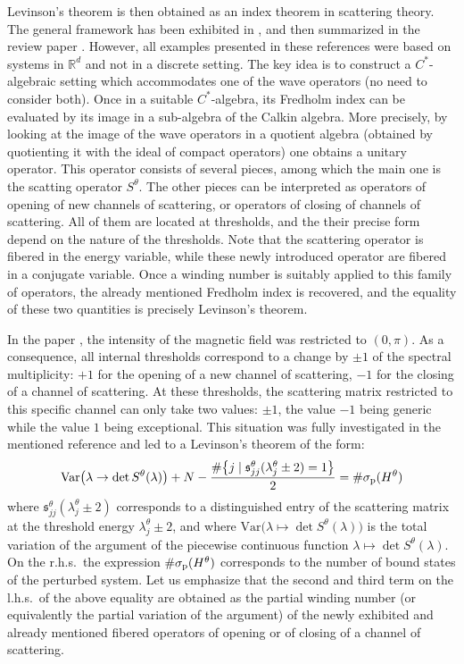 \documentclass[11pt]{article}
\def\R{\mathbb R}
\def\s{\mathfrak s}
\def\Var{\mathrm{Var}}
\begin{document}
Levinson's theorem is then obtained as an index theorem in scattering theory.
The general framework has been exhibited in \cite{KR06, KR07, KR08}, and then summarized in the review paper \cite{Ri}. However, all examples presented in these references
were based on systems in $\R^d$ and not in a discrete setting.
The key idea is to construct a $C^*$-algebraic setting which accommodates one of the wave operators (no need to consider both). Once in a suitable $C^*$-algebra, its Fredholm index can be evaluated by its image in a sub-algebra of the Calkin algebra. More precisely, by looking at the image of the wave operators in a quotient algebra (obtained by quotienting it with the ideal of compact operators) one obtains a unitary operator. 
This operator consists of several pieces, among which the main one is the scatting operator $S^\theta$. 
The other pieces can be interpreted as operators of opening of new channels of scattering, or operators of closing of channels of scattering. All of them are located at thresholds, and the their precise form depend on the nature of the thresholds. Note that the scattering operator is fibered in the energy variable, while these newly introduced operator are fibered in a conjugate variable. Once a winding number
is suitably applied to this family of operators, the already mentioned Fredholm index is recovered, and the equality of these two quantities is precisely Levinson's theorem.

In the paper \cite{APRR}, the intensity of the magnetic field was restricted to $(0,\pi)$.
As a consequence, all internal thresholds correspond to a change by $\pm 1$ of the spectral multiplicity: $+1$ for the opening of a new channel of scattering, $-1$ for the closing of a channel of scattering. At these thresholds, the scattering matrix restricted to this specific channel can only take two values: $\pm 1$,  the value $-1$ being generic while the value $1$ being exceptional. This situation was fully investigated in the mentioned reference
and led to a Levinson's theorem of the form:
\begin{equation}\label{eq_11}
\Var \big(\lambda \to \det S^\theta(\lambda)\big) +N-\frac{\#\big\{j\mid \s^\theta_{jj}(\lambda^\theta_j\pm 2)=1\big\}}2
=\# \sigma_{\rm p}(H^\theta)
\end{equation}
where $\s_{jj}^\theta(\lambda_j^\theta\pm 2)$ corresponds to a distinguished entry of the scattering matrix at the threshold energy $\lambda_j^\theta\pm 2$, and where $\Var \big(\lambda \mapsto \det S^\theta(\lambda)\big)$ 
is  the total variation of the argument of the piecewise continuous function $\lambda\mapsto\det S^\theta(\lambda)$. 
On the r.h.s.~the expression $\# \sigma_{\rm p}(H^\theta)$
corresponds to the number of bound states of the perturbed system. 
Let us emphasize that the second and third term on the l.h.s.~of the above equality
are obtained as the partial winding number (or equivalently the partial variation of the argument) of the newly exhibited and already mentioned fibered operators of opening or of closing of a channel of scattering. 
\end{document}
